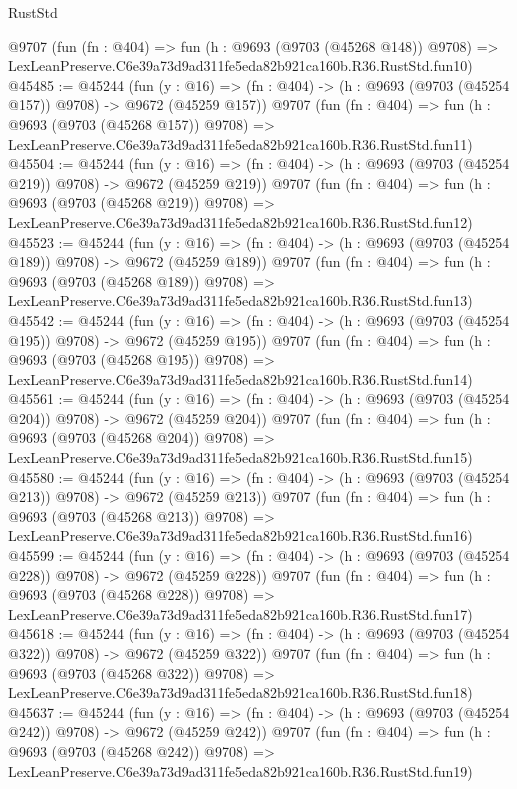 \begin{lexlean}{RustStd}
\begin{coremodule}
    @9707
    (fun (fn : @404) =>
    fun (h : @9693 (@9703 (@45268 @148)) @9708) =>
    LexLeanPreserve.C6e39a73d9ad311fe5eda82b921ca160b.R36.RustStd.fun10)
@45485 := @45244
    (fun (y : @16) => (fn : @404) -> (h : @9693 (@9703 (@45254 @157)) @9708) -> @9672 (@45259 @157))
    @9707
    (fun (fn : @404) =>
    fun (h : @9693 (@9703 (@45268 @157)) @9708) =>
    LexLeanPreserve.C6e39a73d9ad311fe5eda82b921ca160b.R36.RustStd.fun11)
@45504 := @45244
    (fun (y : @16) => (fn : @404) -> (h : @9693 (@9703 (@45254 @219)) @9708) -> @9672 (@45259 @219))
    @9707
    (fun (fn : @404) =>
    fun (h : @9693 (@9703 (@45268 @219)) @9708) =>
    LexLeanPreserve.C6e39a73d9ad311fe5eda82b921ca160b.R36.RustStd.fun12)
@45523 := @45244
    (fun (y : @16) => (fn : @404) -> (h : @9693 (@9703 (@45254 @189)) @9708) -> @9672 (@45259 @189))
    @9707
    (fun (fn : @404) =>
    fun (h : @9693 (@9703 (@45268 @189)) @9708) =>
    LexLeanPreserve.C6e39a73d9ad311fe5eda82b921ca160b.R36.RustStd.fun13)
@45542 := @45244
    (fun (y : @16) => (fn : @404) -> (h : @9693 (@9703 (@45254 @195)) @9708) -> @9672 (@45259 @195))
    @9707
    (fun (fn : @404) =>
    fun (h : @9693 (@9703 (@45268 @195)) @9708) =>
    LexLeanPreserve.C6e39a73d9ad311fe5eda82b921ca160b.R36.RustStd.fun14)
@45561 := @45244
    (fun (y : @16) => (fn : @404) -> (h : @9693 (@9703 (@45254 @204)) @9708) -> @9672 (@45259 @204))
    @9707
    (fun (fn : @404) =>
    fun (h : @9693 (@9703 (@45268 @204)) @9708) =>
    LexLeanPreserve.C6e39a73d9ad311fe5eda82b921ca160b.R36.RustStd.fun15)
@45580 := @45244
    (fun (y : @16) => (fn : @404) -> (h : @9693 (@9703 (@45254 @213)) @9708) -> @9672 (@45259 @213))
    @9707
    (fun (fn : @404) =>
    fun (h : @9693 (@9703 (@45268 @213)) @9708) =>
    LexLeanPreserve.C6e39a73d9ad311fe5eda82b921ca160b.R36.RustStd.fun16)
@45599 := @45244
    (fun (y : @16) => (fn : @404) -> (h : @9693 (@9703 (@45254 @228)) @9708) -> @9672 (@45259 @228))
    @9707
    (fun (fn : @404) =>
    fun (h : @9693 (@9703 (@45268 @228)) @9708) =>
    LexLeanPreserve.C6e39a73d9ad311fe5eda82b921ca160b.R36.RustStd.fun17)
@45618 := @45244
    (fun (y : @16) => (fn : @404) -> (h : @9693 (@9703 (@45254 @322)) @9708) -> @9672 (@45259 @322))
    @9707
    (fun (fn : @404) =>
    fun (h : @9693 (@9703 (@45268 @322)) @9708) =>
    LexLeanPreserve.C6e39a73d9ad311fe5eda82b921ca160b.R36.RustStd.fun18)
@45637 := @45244
    (fun (y : @16) => (fn : @404) -> (h : @9693 (@9703 (@45254 @242)) @9708) -> @9672 (@45259 @242))
    @9707
    (fun (fn : @404) =>
    fun (h : @9693 (@9703 (@45268 @242)) @9708) =>
    LexLeanPreserve.C6e39a73d9ad311fe5eda82b921ca160b.R36.RustStd.fun19)

\end{coremodule}
\end{lexlean}
